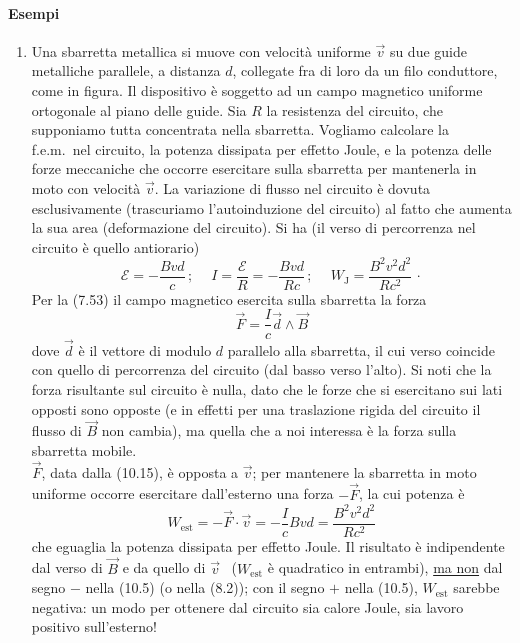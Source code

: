 \paragraph{Esempi}
\begin{enumerate}
  \item Una sbarretta metallica si muove con velocit\`a uniforme $\vec v$ su due
    guide metalliche parallele, a distanza $d$, collegate fra di loro da un filo
    conduttore, come in figura. Il dispositivo \`e soggetto ad un campo
    magnetico uniforme ortogonale al piano delle guide. Sia $R$ la resistenza
    del circuito, che supponiamo tutta concentrata nella sbarretta. Vogliamo
    calcolare la f.e.m.\ nel circuito, la potenza dissipata per effetto Joule, e
    la potenza delle forze meccaniche che occorre esercitare sulla sbarretta per
    mantenerla in moto con velocit\`a $\vec v$.
    La variazione di flusso nel circuito \`e dovuta esclusivamente (trascuriamo
    l'auto\-in\-du\-zio\-ne del circuito) al fatto che aumenta la sua area
    (deformazione del circuito). Si ha (il verso di percorrenza nel circuito \`e
    quello antiorario)
    \begin{equation}
      \mathcal E=-\frac{Bvd}{c}\,;\quad\ I=\frac{\mathcal E}{R}
      =-\frac{Bvd}{Rc}\,;\quad\ W_\mathrm{J}=\frac{B^2v^2d^2}{Rc^2}\,\cdot
      \tag{10.14}
    \end{equation}
    Per la (7.53) il campo magnetico esercita sulla sbarretta la forza
    \begin{equation}
      \vec F=\frac{I}{c}\vec d\wedge\vec B
      \tag{10.15}
    \end{equation}
    dove $\vec d$ \`e il vettore di modulo $d$ parallelo alla sbarretta, il cui
    verso coincide con quello di percorrenza del circuito (dal basso verso
    l'alto). Si noti che la forza risultante sul circuito \`e nulla, dato che le
    forze che si esercitano sui lati opposti sono opposte (e in effetti per una
    traslazione rigida del circuito il flusso di $\vec B$ non cambia), ma quella
    che a noi interessa \`e la forza sulla sbarretta mobile.\\
    $\vec F$, data dalla (10.15), \`e opposta a $\vec v$; per mantenere la
    sbarretta in moto uniforme occorre esercitare dall'esterno una forza
    $-\vec F$, la cui potenza \`e
    \begin{equation}
      W_\mathrm{est}=-\vec F\cdot\vec v=-\frac{I}{c}Bvd=\frac{B^2v^2d^2}{Rc^2}
      \tag{10.16}
    \end{equation}
    che eguaglia la potenza dissipata per effetto Joule. Il risultato \`e
    indipendente dal verso di $\vec B$ e da quello di $\vec v$
    \ ($W_\mathrm{est}$ \`e quadratico in entrambi), \underline{ma non} dal
    segno $-$ nella (10.5) \big(o nella (8.2)\big); con il segno $+$ nella
    (10.5), $W_\mathrm{est}$ sarebbe negativa: un modo per ottenere dal circuito
    sia calore Joule, sia lavoro positivo sull'esterno!


\end{enumerate}
